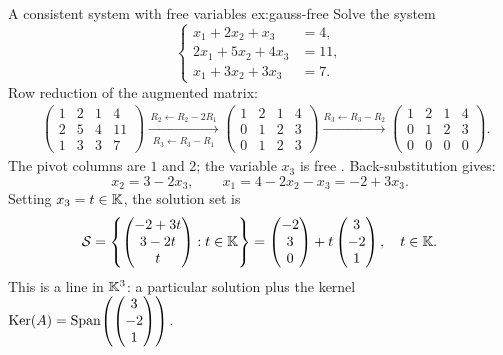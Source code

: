 \begin{example}{A consistent system with free variables}%
{ex:gauss-free}
Solve the system
\[
  \left\{
  \begin{aligned}
    x_1 + 2x_2 + x_3 &= 4,\\
    2x_1 + 5x_2 + 4x_3 &= 11,\\
    x_1 + 3x_2 + 3x_3 &= 7.
  \end{aligned}
  \right.
\]
Row reduction of the augmented matrix:
\begin{align*}
  &\left(\begin{array}{ccc|c}
    1 & 2 & 1 & 4\\
    2 & 5 & 4 & 11\\
    1 & 3 & 3 & 7
  \end{array}\right)
  \xrightarrow[\substack{R_3 \leftarrow R_3 - R_1}]{R_2 \leftarrow R_2 - 2R_1}
  \left(\begin{array}{ccc|c}
    1 & 2 & 1 & 4\\
    0 & 1 & 2 & 3\\
    0 & 1 & 2 & 3
  \end{array}\right)
  \xrightarrow{R_3 \leftarrow R_3 - R_2}
  \left(\begin{array}{ccc|c}
    1 & 2 & 1 & 4\\
    0 & 1 & 2 & 3\\
    0 & 0 & 0 & 0
  \end{array}\right).
\end{align*}
The pivot columns are $1$ and $2$; the variable $x_3$ is free
. Back-substitution gives:
\[
  x_2 = 3 - 2x_3, \qquad x_1 = 4 - 2x_2 - x_3 = -2 + 3x_3.
\]
Setting $x_3 = t \in {\mathbb{K}}$, the solution set is
\[
  {\mathcal{S}} = \left\{\begin{pmatrix} -2+3t\\ 3-2t\\ t \end{pmatrix}
  : t\in{\mathbb{K}}\right\}
  = \begin{pmatrix} -2\\3\\0 \end{pmatrix}
  + t\begin{pmatrix} 3\\-2\\1 \end{pmatrix},
  \quad t\in{\mathbb{K}}.
\]
This is a line in ${\mathbb{K}}^3$: a particular solution plus the kernel
$\operatorname{Ker}(A) = \operatorname{Span}\!\left(\begin{pmatrix}3\\-2\\1\end{pmatrix}\right)$.
\end{example}


